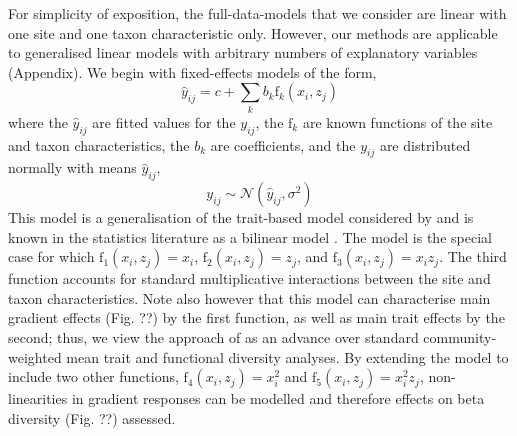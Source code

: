 \documentclass[12pt]{ecology}
\begin{document}

For simplicity of exposition, the full-data-models that we consider are linear with one site and one taxon characteristic only.  However, our methods are applicable to generalised linear models with arbitrary numbers of explanatory variables (Appendix).  We begin with fixed-effects models of the form,
\begin{equation}
\hat{y}_{ij} = c + 
	\sum_k b_k \mathrm{f}_k (x_i, z_j)
\end{equation}
where the $\hat{y}_{ij}$ are fitted values for the $y_{ij}$, the $\mathrm{f}_k$ are known functions of the site and taxon characteristics, the $b_k$ are coefficients, and the $y_{ij}$ are distributed normally with means $\hat{y}_{ij}$,
\begin{equation}
y_{ij} \sim \mathcal{N}(\hat{y}_{ij},\sigma^2)
\end{equation}
This model is a generalisation of the trait-based model considered by \citet{CormontEtAl2011} and is known in the statistics literature as a bilinear model \citep{Gabriel1998}.  The \citet{CormontEtAl2011} model is the special case for which $\mathrm{f}_1(x_i, z_j) = x_i$, $\mathrm{f}_2(x_i, z_j) = z_j$, and $\mathrm{f}_3(x_i, z_j) = x_i z_j$.  The third function accounts for standard multiplicative interactions between the site and taxon characteristics.  Note also however that this model can characterise main gradient effects (Fig. ??) by the first function, as well as main trait effects by the second; thus, we view the approach of \citet{CormontEtAl2011} as an advance over standard community-weighted mean trait and functional diversity analyses.  By extending the model to include two other functions, $\mathrm{f}_4(x_i, z_j) = x_i^2$ and $\mathrm{f}_5(x_i, z_j) = x_i^2 z_j$, non-linearities in gradient responses can be modelled and therefore effects on beta diversity (Fig. ??) assessed.
\end{document}
